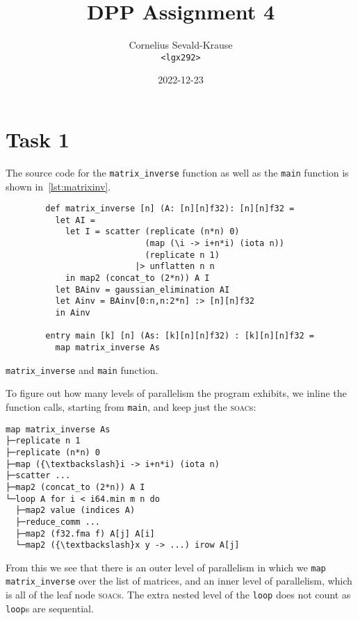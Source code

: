 \documentclass{article}
\begin{document}
\title{DPP Assignment 4}
\author{Cornelius Sevald-Krause \\ \texttt{<lgx292>}}
\date{2022-12-23}
\maketitle

\section*{Task 1}

The source code for the \verb|matrix_inverse| function as well as the
\verb|main| function is shown in~\cref{lst:matrixinv}.

\begin{listing}[t]
    \centering
    \begin{verbatim}
        def matrix_inverse [n] (A: [n][n]f32): [n][n]f32 =
          let AI =
            let I = scatter (replicate (n*n) 0)
                            (map (\i -> i+n*i) (iota n))
                            (replicate n 1)
                          |> unflatten n n
            in map2 (concat_to (2*n)) A I
          let BAinv = gaussian_elimination AI
          let Ainv = BAinv[0:n,n:2*n] :> [n][n]f32
          in Ainv

        entry main [k] [n] (As: [k][n][n]f32) : [k][n][n]f32 =
          map matrix_inverse As
    \end{verbatim}
    \caption{\texttt{matrix\_inverse} and \texttt{main} function.}
    \label{lst:matrixinv}
\end{listing}

To figure out how many levels of parallelism the program exhibits, we inline the
function calls, starting from \verb|main|, and keep just the \textsc{soac}s:
\begin{Verbatim}[commandchars=\\\{\}]
map matrix_inverse As
├─replicate n 1
├─replicate (n*n) 0
├─map ({\textbackslash}i -> i+n*i) (iota n)
├─scatter ...
├─map2 (concat_to (2*n)) A I
└─loop A for i < i64.min m n do
  ├─map2 value (indices A)
  ├─reduce_comm ...
  ├─map2 (f32.fma f) A[j] A[i]
  └─map2 ({\textbackslash}x y -> ...) irow A[j]
\end{Verbatim}
From this we see that there is an outer level of parallelism in which we
\verb|map| \verb|matrix_inverse| over the list of matrices, and an inner level
of parallelism, which is all of the leaf node \textsc{soac}s. The extra nested
level of the \verb|loop| does not count as \verb|loop|s are sequential.
\end{document}
